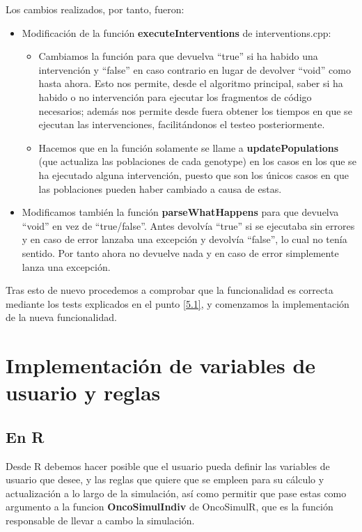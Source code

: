 Los cambios realizados, por tanto, fueron:
\begin{itemize}
	\item Modificación de la función \textbf{executeInterventions} de interventions.cpp:
	\begin{itemize}
		\item Cambiamos la función para que devuelva ``true'' si ha habido una intervención y ``false'' en caso contrario en lugar de devolver ``void'' como hasta ahora. Esto nos permite, desde el algoritmo principal, saber si ha habido o no intervención para ejecutar los fragmentos de código necesarios; además nos permite desde fuera obtener los tiempos en que se ejecutan las intervenciones, facilitándonos el testeo posteriormente.
		\item  Hacemos que en la función solamente se llame a \textbf{updatePopulations} (que actualiza las poblaciones de cada \gls{genotype}) en los casos en los que se ha ejecutado alguna intervención, puesto que son los únicos casos en que las poblaciones pueden haber cambiado a causa de estas.
	\end{itemize}
	\item Modificamos también la función \textbf{parseWhatHappens} para que devuelva ``void'' en vez de ``true/false''. Antes devolvía ``true'' si se ejecutaba sin errores y en caso de error lanzaba una excepción y devolvía ``false'', lo cual no tenía sentido. Por tanto ahora no devuelve nada y en caso de error simplemente lanza una excepción.
\end{itemize}

Tras esto de nuevo procedemos a comprobar que la funcionalidad es correcta mediante los tests explicados en el punto \ref{5.1}, y comenzamos la implementación de la nueva funcionalidad.

\section{Implementación de variables de usuario y reglas}\label{4.4}

\subsection{En R}\label{4.4.1}

Desde R debemos hacer posible que el usuario pueda definir las variables de usuario que desee, y las reglas que quiere que se empleen para su cálculo y actualización a lo largo de la simulación, así como permitir que pase estas como argumento a la funcion \textbf{OncoSimulIndiv} de OncoSimulR, que es la función responsable de llevar a cambo la simulación.

